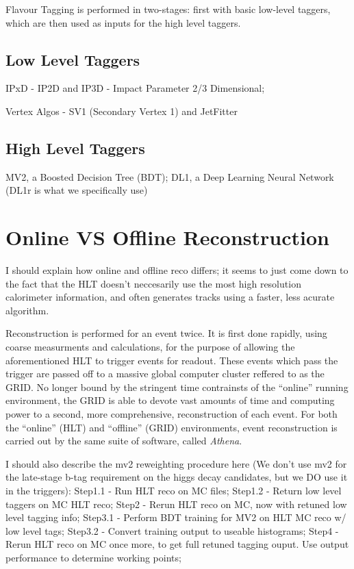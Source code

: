         Flavour Tagging is performed in two-stages:
            first with basic low-level taggers,
            which are then used as inputs for the high level taggers.

        \subsection{Low Level Taggers}

            IPxD - IP2D and IP3D - Impact Parameter 2/3 Dimensional; 

            Vertex Algos - SV1 (Secondary Vertex 1) and JetFitter
            \cite{thesis_giacinto}

        \subsection{High Level Taggers}

            MV2, a Boosted Decision Tree (BDT);
            DL1, a Deep Learning Neural Network (DL1r is what we specifically use)
            \cite{bjet_id_and_performance}
            \cite{btagging_optimisation}

    \section{Online VS Offline Reconstruction}
        I should explain how online and offline reco differs;
            it seems to just come down to the fact that the HLT doesn't neccesarily use the most high resolution calorimeter information,
            and often generates tracks using a faster, less acurate algorithm.

        Reconstruction is performed for an event twice.
        It is first done rapidly, using coarse measurments and calculations,
            for the purpose of allowing the aforementioned HLT to trigger events for readout.
        These events which pass the trigger are passed off to a massive global computer cluster reffered to as the GRID.
        No longer bound by the stringent time contrainsts of the ``online'' running environment,
            the GRID is able to devote vast amounts of time and computing power to a second, 
            more comprehensive, reconstruction of each event.
        For both the ``online'' (HLT) and ``offline'' (GRID) environments, event reconstruction is carried out by the same suite of software,
            called \textit{Athena}.
            
        I should also describe the mv2 reweighting procedure here
            (We don't use mv2 for the late-stage b-tag requirement on the higgs decay candidates,
            but we DO use it in the triggers):
            Step1.1 - Run HLT reco on MC files;
            Step1.2 - Return low level taggers on MC HLT reco;
            Step2   - Rerun HLT reco on MC, now with retuned low level tagging info;
            Step3.1 - Perform BDT training for MV2 on HLT MC reco w/ low level tags;
            Step3.2 - Convert training output to useable histograms;
            Step4   - Rerun HLT reco on MC once more, to get full retuned tagging ouput. Use output performance to determine working points;



